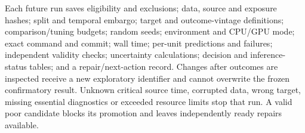 Each future run saves eligibility and exclusions; data, source and exposure hashes; split and temporal embargo; target and outcome-vintage definitions; comparison/tuning budgets; random seeds; environment and CPU/GPU mode; exact command and commit; wall time; per-unit predictions and failures; independent validity checks; uncertainty calculations; decision and inference-status tables; and a repair/next-action record. Changes after outcomes are inspected receive a new exploratory identifier and cannot overwrite the frozen confirmatory result. Unknown critical source time, corrupted data, wrong target, missing essential diagnostics or exceeded resource limits stop that run. A valid poor candidate blocks its promotion and leaves independently ready repairs available.
